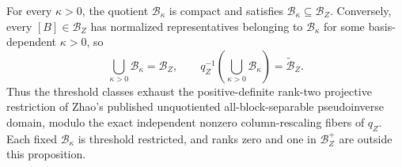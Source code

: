 For every \(\kappa>0\), the quotient \(\mathcal B_\kappa\) is compact and satisfies \(\mathcal B_\kappa\subseteq\mathcal B_Z\).  Conversely, every \([B]\in\mathcal B_Z\) has normalized representatives belonging to \(\mathcal B_\kappa\) for some basis-dependent \(\kappa>0\), so
\[
\bigcup_{\kappa>0}\mathcal B_\kappa=\mathcal B_Z,
\qquad
q_Z^{-1}\!\left(\bigcup_{\kappa>0}\mathcal B_\kappa\right)=\widetilde{\mathcal B}_Z.
\]
Thus the threshold classes exhaust the positive-definite rank-two projective restriction of Zhao's published unquotiented all-block-separable pseudoinverse domain, modulo the exact independent nonzero column-rescaling fibers of \(q_Z\).  Each fixed \(\mathcal B_\kappa\) is threshold restricted, and ranks zero and one in \(\mathcal B_Z^+\) are outside this proposition.